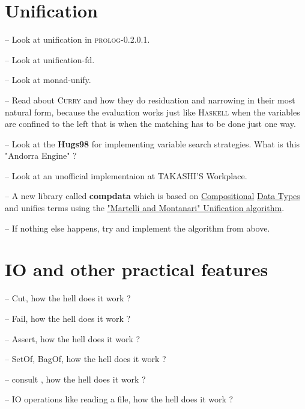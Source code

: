 \documentclass[11pt]{article}
\let\oldmarginpar\marginpar
\renewcommand\marginpar[1]{\-\oldmarginpar[\raggedleft #1]%
{\raggedright #1}}
\newenvironment{checklist}{%
  \begin{list}{}{}%
  \let\olditem\item
  \renewcommand\item{\olditem -- \marginpar{$\Box$} }
  \newcommand\checkeditem{\olditem -- \marginpar{$\CheckedBox$} }
}{%
  \end{list}
}
\begin{document}
\section{Unification}
\begin{checklist}
\item Look at unification in \textsc{prolog-0.2.0.1}.

\item Look at unification-fd.

\item Look at monad-unify.

 \item Read about \textsc{Curry} and how they do residuation and narrowing in their most natural form, because the evaluation works just 
 like \textsc{Haskell} when the variables are confined to the left that is when the matching has to be done just one way.
 
 \item Look at the \textbf{Hugs98} for implementing variable search strategies. What is this "Andorra Engine" ?

\item Look at an unofficial implementaion at TAKASHI'S Workplace.

\item A new library called \textbf{compdata} which is based on 
\href{http://www.diku.dk/~paba/pubs/files/bahr11wgp-paper.pdf}{Compositional} 
\href{http://www.diku.dk/~paba/pubs/files/bahr11wgp-paper.pdf}{Data Types} and unifies terms using the 
 \href{http://www.nsl.com/misc/papers/martelli-montanari.pdf}{"Martelli and Montanari" Unification algorithm}.

\item If nothing else happens, try and implement the algorithm from above.

\end{checklist}

\section{IO and other practical features}
\begin{checklist}
\item Cut, how the hell does it work ?

\item Fail, how the hell does it work ?

\item Assert, how the hell does it work ?

\item SetOf, BagOf, how the hell does it work ?

\item consult , how the hell does it work ?

\item IO operations like reading a file, how the hell does it work ?
\end{checklist}
\end{document}
